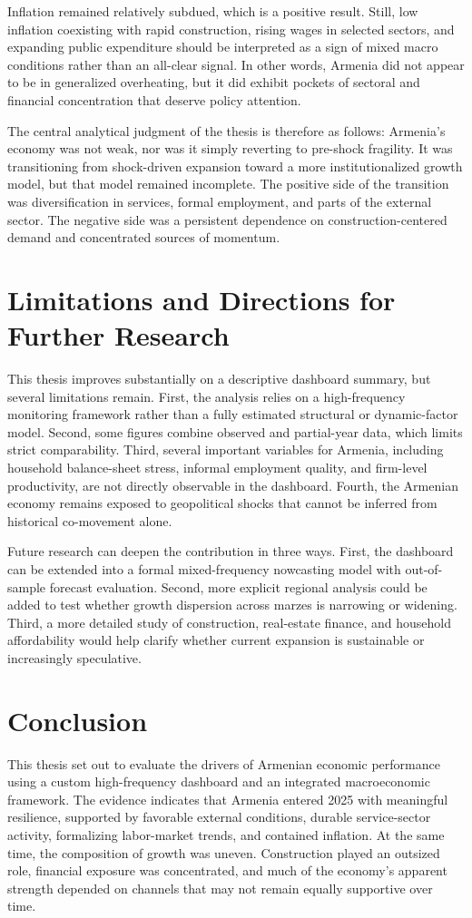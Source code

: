 \documentclass[12pt,a4paper]{report}
\begin{document}
Inflation remained relatively subdued, which is a positive result. Still, low inflation coexisting with rapid construction, rising wages in selected sectors, and expanding public expenditure should be interpreted as a sign of mixed macro conditions rather than an all-clear signal. In other words, Armenia did not appear to be in generalized overheating, but it did exhibit pockets of sectoral and financial concentration that deserve policy attention.

The central analytical judgment of the thesis is therefore as follows: Armenia's economy was not weak, nor was it simply reverting to pre-shock fragility. It was transitioning from shock-driven expansion toward a more institutionalized growth model, but that model remained incomplete. The positive side of the transition was diversification in services, formal employment, and parts of the external sector. The negative side was a persistent dependence on construction-centered demand and concentrated sources of momentum.

\chapter{Limitations and Directions for Further Research}
This thesis improves substantially on a descriptive dashboard summary, but several limitations remain. First, the analysis relies on a high-frequency monitoring framework rather than a fully estimated structural or dynamic-factor model. Second, some figures combine observed and partial-year data, which limits strict comparability. Third, several important variables for Armenia, including household balance-sheet stress, informal employment quality, and firm-level productivity, are not directly observable in the dashboard. Fourth, the Armenian economy remains exposed to geopolitical shocks that cannot be inferred from historical co-movement alone.

Future research can deepen the contribution in three ways. First, the dashboard can be extended into a formal mixed-frequency nowcasting model with out-of-sample forecast evaluation. Second, more explicit regional analysis could be added to test whether growth dispersion across marzes is narrowing or widening. Third, a more detailed study of construction, real-estate finance, and household affordability would help clarify whether current expansion is sustainable or increasingly speculative.

\chapter{Conclusion}
This thesis set out to evaluate the drivers of Armenian economic performance using a custom high-frequency dashboard and an integrated macroeconomic framework. The evidence indicates that Armenia entered 2025 with meaningful resilience, supported by favorable external conditions, durable service-sector activity, formalizing labor-market trends, and contained inflation. At the same time, the composition of growth was uneven. Construction played an outsized role, financial exposure was concentrated, and much of the economy's apparent strength depended on channels that may not remain equally supportive over time.\cite{imfCR24348,wbPulse2025,cbaImpl2025}
\end{document}
